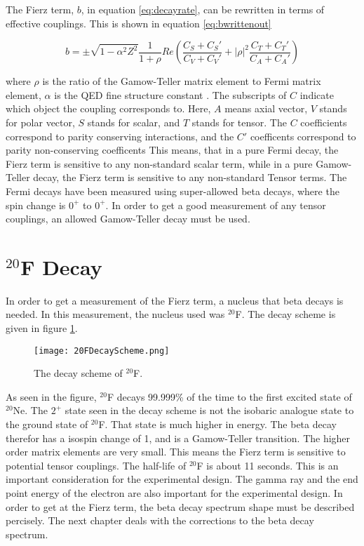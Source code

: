 The Fierz term, $b$, in equation \ref{eq:decayrate}, can be rewritten in terms of effective couplings.
This is shown in equation \ref{eq:bwrittenout}

\begin{equation}
	b =  \pm \sqrt{1 - \alpha^{2}{Z^2}}\frac{1}{1 + \rho}Re(\frac{C_{S} + C_{S}'}{C_{V} + C_{V}'} + |\rho|^{2}\frac{C_{T} + C_{T}'}{C_{A} + C_{A}'})
	\label{eq:bwrittenout}
\end{equation}

where $\rho$ is the ratio of the Gamow-Teller matrix element to Fermi matrix element, $\alpha$ is the QED fine structure constant \cite{OSCARPAPER}. 
The subscripts of $C$ indicate which object the coupling corresponds to. 
Here, $A$ means axial vector, $V$ stands for polar vector, $S$ stands for scalar, and $T$ stands for tensor. 
The $C$ coefficients correspond to parity conserving interactions, and the $C'$ coefficents correspond to parity non-conserving coefficents \cite{Lee56}
This means, that in a pure Fermi decay, the Fierz term is sensitive to any non-standard scalar term, while in a pure Gamow-Teller decay, the Fierz term is sensitive to any non-standard Tensor terms. 
The Fermi decays have been measured using super-allowed beta decays, where the spin change is $0^{+}$ to $0^{+}$. 
In order to get a good measurement of any tensor couplings, an allowed Gamow-Teller decay must be used. 

\section{$^{20}$F Decay}
In order to get a measurement of the Fierz term, a nucleus that beta decays is needed.
In this measurement, the nucleus used was $^{20}$F.
The decay scheme is given in figure \ref{fig:DecayScheme}.

\begin{figure}[!htb]
	\centerline{\texttt{[image: 20FDecayScheme.png]}}
	\caption{The decay scheme of $^{20}$F.}
	\label{fig:DecayScheme}
\end{figure}

As seen in the figure, $^{20}$F decays 99.999\% of the time to the first excited state of $^{20}$Ne.
The $2^{+}$ state seen in the decay scheme is not the isobaric analogue state to the ground state of $^{20}$F.
That state is much higher in energy.
The beta decay therefor has a isospin change of 1, and is a Gamow-Teller transition.
The higher order matrix elements are very small.
This means the Fierz term is sensitive to potential tensor couplings.
The half-life of $^{20}$F is about 11 seconds. 
This is an important consideration for the experimental design.
The gamma ray and the end point energy of the electron are also important for the experimental design.
In order to get at the Fierz term, the beta decay spectrum shape must be described percisely.
The next chapter deals with the corrections to the beta decay spectrum.  

